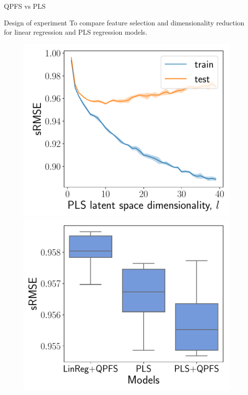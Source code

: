\documentclass[9pt]{beamer}
\begin{document}
\begin{frame}{QPFS vs PLS}

\begin{block}{Design of experiment}
	To compare feature selection and dimensionality reduction for linear regression and PLS regression models.
\end{block}

\begin{figure}[h]
	\begin{minipage}{.5\linewidth}
		\centering
		\includegraphics[width=1.\linewidth]{figs/pls_vs_k}
	\end{minipage}%
	\begin{minipage}{.5\linewidth}
		\centering
		\includegraphics[width=1.\linewidth]{figs/models}
	\end{minipage}
\end{figure}

\end{frame}
\end{document}
